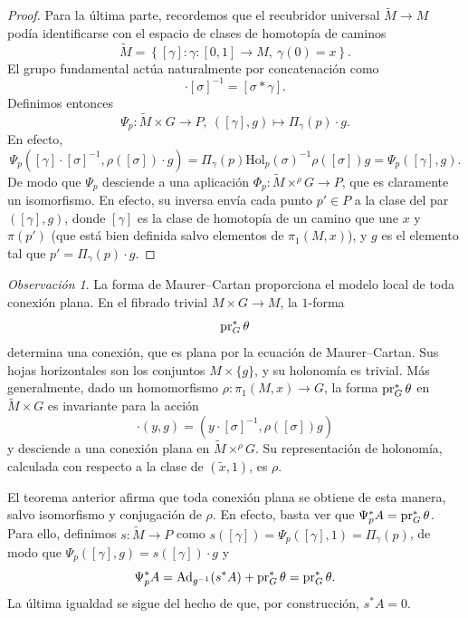 \documentclass[11pt,a4paper]{amsbook}
\theoremstyle{remark} \newtheorem{rmk}[subsection]{Observación}
\theoremstyle{definition} \newtheorem{defn}[subsection]{Definición}
\theoremstyle{definition} \newtheorem{ex}[subsection]{Ejemplo}
\theoremstyle{definition} \newtheorem{ej}[subsection]{Ejercicio}
\begin{document}
\begin{proof}
Para la última parte, recordemos que el recubridor universal $\widetilde{M}\rightarrow M$ podía identificarse con el espacio de clases de homotopía de caminos
\begin{equation*}
\widetilde{M} = \left\{ [\gamma]: \gamma:[0,1] \rightarrow M,\ \gamma(0)=x  \right\}.
\end{equation*}
El grupo fundamental actúa naturalmente por concatenación como
\begin{equation*}
[\gamma] \cdot [\sigma]^{-1} = [\sigma * \gamma].
\end{equation*}
Definimos entonces
\begin{equation*}
\Psi_{p} :\widetilde{M} \times G \rightarrow P,\ ([\gamma], g) \mapsto \Pi_{\gamma}(p) \cdot g.
\end{equation*}
En efecto,
\begin{equation*}
\Psi_{p}([\gamma]\cdot [\sigma]^{-1}, \rho([\sigma]) \cdot g) = \Pi_{\gamma}(p)\mathrm{Hol}_{p}(\sigma)^{-1} \rho([\sigma]) g = \Psi_{p}([\gamma],g).
\end{equation*}
De modo que $\Psi_{p}$ desciende a una aplicación $\Phi_{p}:\widetilde{M} \times^\rho G \rightarrow P$, que es claramente un isomorfismo. En efecto, su inversa envía cada punto $p' \in P$ a la clase del par $([\gamma],g)$, donde $[\gamma]$ es la clase de homotopía de un camino que une $x$ y $\pi(p')$ (que está bien definida salvo elementos de $\pi_1(M,x)$), y $g$ es el elemento tal que
$p' = \Pi_\gamma(p) \cdot g$.
\end{proof}

\begin{rmk}
La forma de Maurer--Cartan proporciona el modelo local de toda conexión plana. En el fibrado trivial $M\times G\rightarrow M$, la $1$-forma
\begin{equation*}
\operatorname{pr}_G^*\theta
\end{equation*}
determina una conexión, que es plana por la ecuación de Maurer--Cartan. Sus hojas horizontales son los conjuntos $M\times\{g\}$, y su holonomía es trivial. Más generalmente, dado un homomorfismo $\rho:\pi_1(M,x)\rightarrow G$, la forma $\operatorname{pr}_G^*\theta$ en $\widetilde M\times G$ es invariante para la acción
\begin{equation*}
[\sigma]\cdot(y,g)=(y\cdot[\sigma]^{-1},\rho([\sigma])g)
\end{equation*}
y desciende a una conexión plana en $\widetilde M\times^\rho G$. Su representación de holonomía, calculada con respecto a la clase de $(\tilde x,1)$, es $\rho$.

El teorema anterior afirma que toda conexión plana se obtiene de esta manera, salvo isomorfismo y conjugación de $\rho$. En efecto, basta ver que $\Psi_p^* A = \operatorname{pr}_G^* \theta$. Para ello, definimos $s: \tilde{M} \rightarrow P$ como $s([\gamma])=\Psi_p([\gamma],1)=\Pi_\gamma(p)$, de modo que $\Psi_p([\gamma],g) = s([\gamma]) \cdot g$ y
\begin{equation*}
\Psi_p^* A = \operatorname{Ad}_{g^{-1}}(s^* A) + \operatorname{pr}_G^* \theta = \operatorname{pr}_G^* \theta.
\end{equation*}
La última igualdad se sigue del hecho de que, por construcción, $s^* A= 0$.
\end{rmk}
\end{document}
